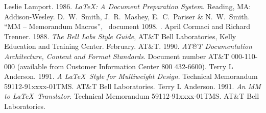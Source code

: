 \begin{thebibliography}{99}

Leslie Lamport.  1986.  {\it \LaTeX : A Document
Preparation System}.  Reading, MA: Addison-Wesley.
D.\ W.\ Smith, J.\ R.\ Mashey, E.\ C.\ Pariser \& N.\
W.\ Smith. ``MM -- Memorandum Macros'', \UNIX\ document 1098.
.
April Cormaci and Richard Trenner.  1988. {\it The Bell
Labs Style Guide}, AT\&T Bell Laboratories, Kelly Education and
Training Center. February.
AT\&T. 1990. {\it AT\&T Documentation Architecture,
Content and Format Standards}. Document number AT\&T 000-110-000
(available from Customer Information Center 800 432-6600).
Terry L Anderson.  1991. {\it A \LaTeX\ Style for Multiweight
Design}.  Technical Memorandum 59112-91xxxx-01TMS. AT\&T Bell Laboratories.
\bibitem{bib:mm2tex}Terry L Anderson.  1991. {\it An MM to \LaTeX\
Translator}. Technical Memorandum 59112-91xxxx-01TMS. AT\&T Bell Laboratories.
\end{thebibliography}
\appendices
